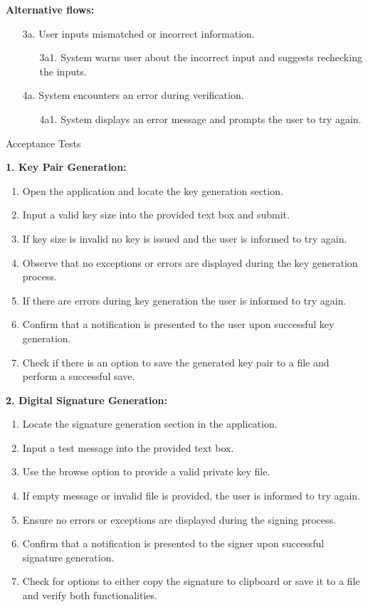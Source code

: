 \documentclass[]{final_report}
\theoremstyle{definition}
\begin{document}
\noindent\textbf{Alternative flows:}
\begin{enumerate}
    \item[3a.] User inputs mismatched or incorrect information.
    \begin{enumerate}
        \item[3a1.] System warns user about the incorrect input and suggests rechecking the inputs.
    \end{enumerate}
    \item[4a.] System encounters an error during verification.
    \begin{enumerate}
        \item[4a1.] System displays an error message and prompts the user to try again.
    \end{enumerate}
\end{enumerate}

Acceptance Tests

\textbf{1. Key Pair Generation:}
\begin{enumerate}
\item Open the application and locate the key generation section.
\item Input a valid key size into the provided text box and submit.
\item If key size is invalid no key is issued and the user is informed to try again. 
\item Observe that no exceptions or errors are displayed during the key generation process.
\item If there are errors during key generation the user is informed to try again.
\item Confirm that a notification is presented to the user upon successful key generation.
\item Check if there is an option to save the generated key pair to a file and perform a successful save.
\end{enumerate}

\textbf{2. Digital Signature Generation:}
\begin{enumerate}
\item Locate the signature generation section in the application.
\item Input a test message into the provided text box.
\item Use the browse option to provide a valid private key file.
\item If empty message or invalid file is provided, the user is informed to try again. 
\item Ensure no errors or exceptions are displayed during the signing process.
\item Confirm that a notification is presented to the signer upon successful signature generation.
\item Check for options to either copy the signature to clipboard or save it to a file and verify both functionalities.
\end{enumerate}
\end{document}
